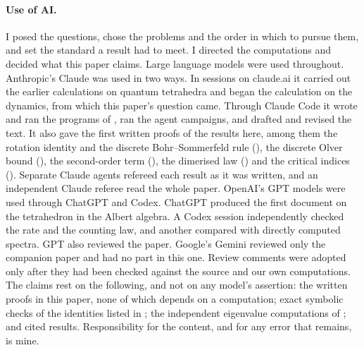 \paragraph{Use of AI.} I posed the questions, chose the problems and the order in which to
pursue them, and set the standard a result had to meet. I directed the computations and
decided what this paper claims. Large language models were used throughout. Anthropic's
Claude was used in two ways. In sessions on claude.ai it carried out the earlier
calculations on quantum tetrahedra and began the calculation on the dynamics, from which
this paper's question came. Through Claude Code it wrote and ran the programs of
, ran the agent campaigns, and drafted and revised the text. It also gave
the first written proofs of the results here, among them the rotation identity and the
discrete Bohr--Sommerfeld rule (), the discrete Olver bound
(), the second-order term (), the dimerised law
() and the critical indices (). Separate Claude agents
refereed each result as it was written, and an independent Claude referee read the whole
paper. OpenAI's GPT models were used through ChatGPT and Codex. ChatGPT produced the first
document on the tetrahedron in the Albert algebra. A Codex session independently checked
the rate and the counting law, and another compared  with directly
computed spectra. GPT also reviewed the paper. Google's Gemini reviewed only the companion
paper and had no part in this one. Review comments were adopted only after they had been
checked against the source and our own computations. The claims rest on the following, and
not on any model's assertion: the written proofs in this paper, none of which depends on a
computation; exact symbolic checks of the identities listed in ; the
independent eigenvalue computations of ; and cited results.
Responsibility for the content, and for any error that remains, is mine.
